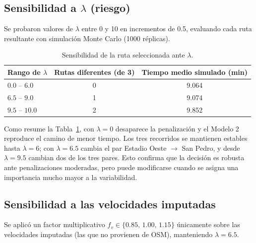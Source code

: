 \documentclass[11pt]{article}
\numberwithin{equation}{section}
\begin{document}
\subsection{Sensibilidad a \texorpdfstring{$\lambda$}{lambda} (riesgo)}

Se probaron valores de $\lambda$ entre 0 y 10 en incrementos de 0.5, evaluando cada ruta resultante con simulación Monte Carlo (1000 réplicas).

\begin{table}[h!]
\centering
\begin{tabular}{lcc}
\toprule
\textbf{Rango de $\lambda$} & \textbf{Rutas diferentes (de 3)} & \textbf{Tiempo medio simulado (min)} \\
\midrule
$0.0$ -- $6.0$ & 0 & 9.064 \\
$6.5$ -- $9.0$ & 1 & 9.074 \\
$9.5$ -- $10.0$ & 2 & 9.852 \\
\bottomrule
\end{tabular}
\caption{Sensibilidad de la ruta seleccionada ante $\lambda$.}
\label{tab:sensibilidad_lambda}
\end{table}

Como resume la Tabla~\ref{tab:sensibilidad_lambda}, con $\lambda=0$ desaparece la penalización y el Modelo 2 reproduce el camino de menor tiempo. Los tres recorridos se mantienen estables hasta $\lambda=6$; con $\lambda=6.5$ cambia el par Estadio Oeste $\to$ San Pedro, y desde $\lambda=9.5$ cambian dos de los tres pares. Esto confirma que la decisión es robusta ante penalizaciones moderadas, pero puede modificarse cuando se asigna una importancia mucho mayor a la variabilidad.

\subsection{Sensibilidad a las velocidades imputadas}

Se aplicó un factor multiplicativo $f_v \in \{0.85,\, 1.00,\, 1.15\}$ únicamente sobre las velocidades imputadas (las que no provienen de OSM), manteniendo $\lambda=6.5$.
\end{document}
